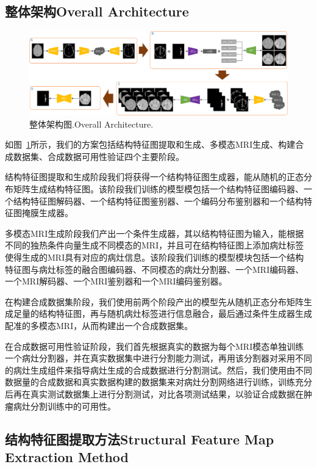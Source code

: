 \documentclass[letterpaper]{article} %
\begin{document}
\subsection{整体架构Overall Architecture}
\begin{figure}[t]
	\centering
	\includegraphics[width=0.98\columnwidth]{figures/architecture}
	\caption{整体架构图.Overall Architecture.}
	\label{architecture}
\end{figure}
如图~\ref{architecture}所示，我们的方案包括结构特征图提取和生成、多模态MRI生成、构建合成数据集、合成数据可用性验证四个主要阶段。

结构特征图提取和生成阶段我们将获得一个结构特征图生成器，能从随机的正态分布矩阵生成结构特征图。该阶段我们训练的模型模包括一个结构特征图编码器、一个结构特征图解码器、一个结构特征图鉴别器、一个编码分布鉴别器和一个结构特征图掩膜生成器。

多模态MRI生成阶段我们产出一个条件生成器，其以结构特征图为输入，能根据不同的独热条件向量生成不同模态的MRI，并且可在结构特征图上添加病灶标签使得生成的MRI具有对应的病灶信息。该阶段我们训练的模型模块包括一个结构特征图与病灶标签的融合图编码器、不同模态的病灶分割器、一个MRI编码器、一个MRI解码器、一个MRI鉴别器和一个MRI编码鉴别器。

在构建合成数据集阶段，我们使用前两个阶段产出的模型先从随机正态分布矩阵生成足量的结构特征图，再与随机病灶标签进行信息融合，最后通过条件生成器生成配准的多模态MRI，从而构建出一个合成数据集。

在合成数据可用性验证阶段，我们首先根据真实的数据为每个MRI模态单独训练一个病灶分割器，并在真实数据集中进行分割能力测试，再用该分割器对采用不同的病灶生成组件来指导病灶生成的合成数据进行分割测试。然后，我们使用由不同数据量的合成数据和真实数据构建的数据集来对病灶分割网络进行训练，训练充分后再在真实测试数据集上进行分割测试，对比各项测试结果，以验证合成数据在肿瘤病灶分割训练中的可用性。

\subsection{结构特征图提取方法Structural Feature Map Extraction Method}
\end{document}
